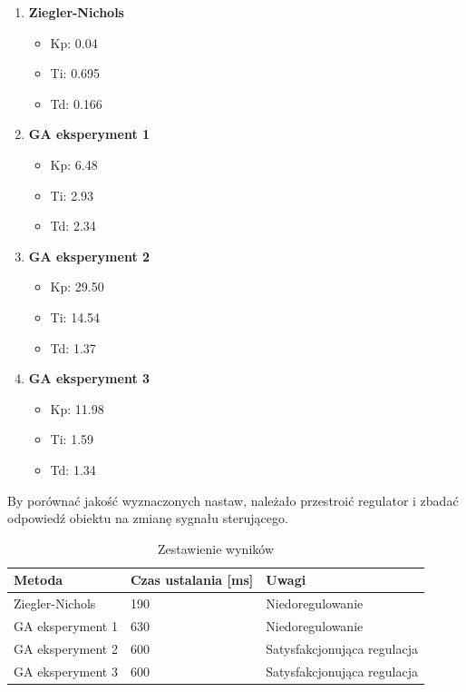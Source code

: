\documentclass[12pt,twoside]{article}
\begin{document}
\begin{enumerate}[label=\alph*), leftmargin=1.25cm]
    \item \textbf{Ziegler-Nichols}
    \begin{itemize}
        \item Kp: 0.04
        \item Ti: 0.695
        \item Td: 0.166
    \end{itemize}
    
    \item \textbf{GA eksperyment 1}
    \begin{itemize}
        \item Kp: 6.48
        \item Ti: 2.93
        \item Td: 2.34
    \end{itemize}
    	
	\item \textbf{GA eksperyment 2}
    \begin{itemize}
        \item Kp: 29.50
        \item Ti: 14.54
        \item Td: 1.37
    \end{itemize}    	
    	
    	\item \textbf{GA eksperyment 3}
    \begin{itemize}
        \item Kp: 11.98
        \item Ti: 1.59
        \item Td: 1.34
    \end{itemize} 
    
\end{enumerate}
%
%
%
By porównać jakość wyznaczonych nastaw, należało przestroić regulator i zbadać odpowiedź obiektu na zmianę sygnału sterującego.
\begin{table}[ht]
\caption{Zestawienie wyników}
\centering		
	\begin{tabular}{|p{}|p{}|p{}|}	
		\hline
		Metoda & Czas ustalania [ms] & Uwagi \\
		\hline
		Ziegler-Nichols & 190 & Niedoregulowanie \\
		\hline
		GA eksperyment 1 & 630 & Niedoregulowanie \\
		\hline
		GA eksperyment 2 & 600 & Satysfakcjonująca regulacja \\
		\hline
		GA eksperyment 3 & 600 & Satysfakcjonująca regulacja \\
		\hline

	\end{tabular}	
	
\label{Tab:HWE1}
\end{table}	
\end{document}
